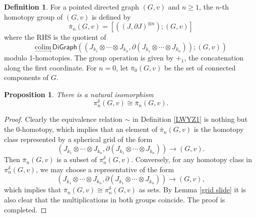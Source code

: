 \documentclass[oneside, 12pt]{amsart}
\numberwithin{equation}{section}
\theoremstyle{plain}
\newtheorem{proposition}[theorem]{Proposition}
\theoremstyle{definition}
\newtheorem{definition}[theorem]{Definition}
\theoremstyle{remark}
\begin{document}
	\begin{definition}
		\label{LWYZ2}
		For a pointed directed graph $(G,v)$ and $n\ge1$, the $n$-th homotopy group of $(G,v)$ is defined by
		\[
		\bar{\pi}_n(G,v)=[\left(\left(J,\partial J\right)^{\otimes n}\right);\left(G,v\right)]
		\]
		where the RHS is the quotient of 
		\[
		\underset{\rightarrow}{\mathrm{colim}}\,\mathsf{DiGraph}\left(\left(J_{k_1}\otimes\cdots\otimes J_{k_n},\partial\left(J_{k_1}\otimes\cdots\otimes J_{k_n}\right)\right);\left(G,v\right)\right)
		\]
		modulo 1-homotopies. The group operation is given by $+_1$, the concatenation along the first coordinate. For $n=0$, let $\bar{\pi}_0(G,v)$ be the set of connected components of $G$.
	\end{definition}
	\begin{proposition}
		\label{two homotopy groups}
		There is a natural isomorphism 
		$$\pi_n^\delta(G,v)\cong\bar{\pi}_n(G,v).$$
	\end{proposition}
	\begin{proof}
		Clearly the equivalence relation $\sim$ in Definition \ref{LWYZ1} is nothing but the 0-homotopy, which implies that an element of $\bar{\pi}_n(G,v)$ is the homotopy class represented by a spherical grid of the form
		\[
		\left(J_{k_1}\otimes\cdots\otimes J_{k_n},\partial\left(J_{k_1}\otimes\cdots\otimes J_{k_n}\right)\right)\to\left(G,v\right).
		\]
		Then $\bar{\pi}_n(G,v)$ is a subset of $\pi_n^\delta(G,v)$. Conversely, for any homotopy class in $\pi_n^\delta(G,v)$, we may choose a representative of the form
		\[
		\left(J_{k_1}\otimes\cdots\otimes J_{k_n},\partial\left(J_{k_1}\otimes\cdots\otimes J_{k_n}\right)\right)\to\left(G,v\right),
		\]
		which implies that $\bar{\pi}_n(G,v)\cong\pi_n^\delta(G,v)$ as sets. By Lemma \ref{grid slide} it is also clear that the multiplications in both groups coincide. The proof is completed.
	\end{proof}
	
\end{document}
